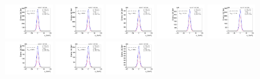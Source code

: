 \begin{figure}[htb]
\includegraphics[width=0.19\textwidth]{plots/Appendix_Recoil_Fits/WmmMC_PF_13TeV_2G/pfu2fit_8.pdf}
\includegraphics[width=0.19\textwidth]{plots/Appendix_Recoil_Fits/WmmMC_PF_13TeV_2G/pfu2fit_9.pdf}
\includegraphics[width=0.19\textwidth]{plots/Appendix_Recoil_Fits/WmmMC_PF_13TeV_2G/pfu2fit_19.pdf}
\includegraphics[width=0.19\textwidth]{plots/Appendix_Recoil_Fits/WmmMC_PF_13TeV_2G/pfu2fit_11.pdf}
\includegraphics[width=0.19\textwidth]{plots/Appendix_Recoil_Fits/WmmMC_PF_13TeV_2G/pfu2fit_12.pdf}
\includegraphics[width=0.19\textwidth]{plots/Appendix_Recoil_Fits/WmmMC_PF_13TeV_2G/pfu2fit_13.pdf}
\includegraphics[width=0.19\textwidth]{plots/Appendix_Recoil_Fits/WmmMC_PF_13TeV_2G/pfu2fit_14.pdf}
\includegraphics[width=0.19\textwidth]{plots/Appendix_Recoil_Fits/WmmMC_PF_13TeV_2G/pfu2fit_15.pdf}

\end{figure}
